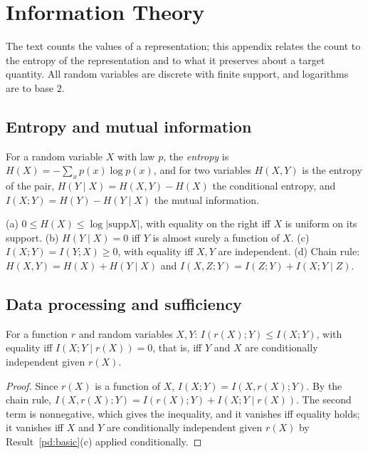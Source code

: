 \chapter{Information Theory}\label{app:info}

The text counts the values of a representation; this appendix relates the count to the entropy of the representation and to what it preserves about a target quantity. All random variables are discrete with finite support, and logarithms are to base $2$.

\section{Entropy and mutual information}

For a random variable $X$ with law $p$, the \emph{entropy} is $H(X)=-\sum_xp(x)\log p(x)$, and for two variables $H(X,Y)$ is the entropy of the pair, $H(Y\mid X)=H(X,Y)-H(X)$ the conditional entropy, and $I(X;Y)=H(Y)-H(Y\mid X)$ the mutual information.

\begin{established}\label{pd:basic}
(a) $0\le H(X)\le\log|\mathrm{supp}X|$, with equality on the right iff $X$ is uniform on its support. (b) $H(Y\mid X)=0$ iff $Y$ is almost surely a function of $X$. (c) $I(X;Y)=I(Y;X)\ge0$, with equality iff $X,Y$ are independent. (d) Chain rule: $H(X,Y)=H(X)+H(Y\mid X)$ and $I(X,Z;Y)=I(Z;Y)+I(X;Y\mid Z)$.
\end{established}

\section{Data processing and sufficiency}

\begin{newresult}\label{pd:dpi}
For a function $r$ and random variables $X,Y$: $I(r(X);Y)\le I(X;Y)$, with equality iff $I(X;Y\mid r(X))=0$, that is, iff $Y$ and $X$ are conditionally independent given $r(X)$.
\end{newresult}
\begin{proof}
Since $r(X)$ is a function of $X$, $I(X;Y)=I(X,r(X);Y)$. By the chain rule, $I(X,r(X);Y)=I(r(X);Y)+I(X;Y\mid r(X))$. The second term is nonnegative, which gives the inequality, and it vanishes iff equality holds; it vanishes iff $X$ and $Y$ are conditionally independent given $r(X)$ by Result~\ref{pd:basic}(c) applied conditionally.
\end{proof}

